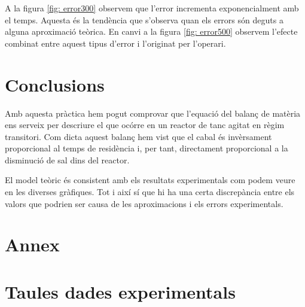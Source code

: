 \documentclass[10pt, twoside]{article}
\begin{document}
A la figura \ref{fig: error300} observem que l'error incrementa exponencialment amb el temps. Aquesta és la tendència que s'observa quan els errors són deguts a alguna aproximació teòrica. En canvi a la figura \ref{fig: error500} observem l'efecte combinat entre aquest tipus d'error i l'originat per l'operari.

\section{Conclusions}
Amb aquesta pràctica hem pogut comprovar que l'equació del balanç de matèria ens serveix per descriure el que ocórre en un reactor de tanc agitat en règim transitori. Com dicta aquest balanç hem vist que el cabal és invèrsament proporcional al temps de residència i, per tant, directament proporcional a la disminució de sal dins del reactor.

El model teòric és consistent amb els resultats experimentals com podem veure en les diverses gràfiques. Tot i així sí que hi ha una certa discrepància entre els valors que podrien ser causa de les aproximacions i els errors experimentals. 

\section*{Annex}

\appendix

\section{Taules dades experimentals}
\end{document}
